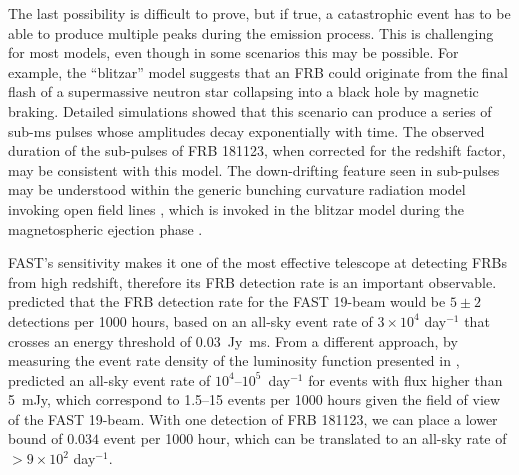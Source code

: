 The last possibility is difficult to prove, but if true, a catastrophic event has to be able to produce multiple peaks during the emission process. This is challenging for most models, even though in some scenarios this may be possible. For example, the ``blitzar'' model \citep{fr14} suggests that an FRB could originate from the final flash of a supermassive neutron star collapsing into a black hole by magnetic braking. Detailed simulations \citep{most18} showed that this scenario can produce a series of sub-ms pulses whose amplitudes decay exponentially with time. The observed duration of the sub-pulses of FRB 181123, when corrected for the redshift factor, may be consistent with this model. The down-drifting feature seen in sub-pulses may be understood within the generic bunching curvature radiation model invoking open field lines \citep{wang19}, which is invoked in the blitzar model during the magnetospheric ejection phase \citep{most18}. 



FAST's sensitivity makes it one of the most effective telescope at detecting FRBs from high redshift, therefore its FRB detection rate is an important observable. 
\citet{lhz+17} predicted that the FRB detection rate for the FAST 19-beam would be $5\pm2$ detections per 1000 hours, based on an all-sky event rate of $3\times10^4$ day$^{-1}$ that crosses an energy threshold of 0.03~Jy~ms.
From a different approach, by measuring the event rate density of the luminosity function presented in \citet{lllz18}, \citet{lml+20} predicted an all-sky event rate of $10^4$--$10^5$~day$^{-1}$ for events with flux higher than 5~mJy, which correspond to 1.5--15 events per 1000 hours given the field of view of the FAST 19-beam.
With one detection of FRB 181123, we 
can place a lower bound of $0.034$ event per 1000 hour,
which can be translated to an all-sky rate of $>9\times10^2$ day$^{-1}$. 


